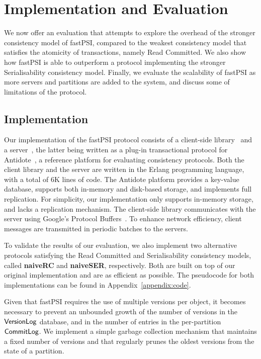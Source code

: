 \cleardoublepage
\chapter{Implementation and Evaluation}
\label{chapter:evaluation}

We now offer an evaluation that attempts to explore the overhead of the stronger consistency model of fastPSI, compared to the weakest consistency model that satisfies the atomicity of transactions, namely Read Committed. We also show how fastPSI is able to outperform a protocol implementing the stronger Serialisability consistency model. Finally, we evaluate the scalability of fastPSI as more servers and partitions are added to the system, and discuss some of limitations of the protocol.

\section{Implementation}

Our implementation of the fastPSI protocol consists of a client-side library~\citep{fastPSIclient} and a server~\citep{pvc-server}, the latter being written as a plug-in transactional protocol for Antidote~\citep{antidote-db}, a reference platform for evaluating consistency protocols. Both the client library and the server are written in the Erlang programming language, with a total of 6K lines of code. The Antidote platform provides a key-value database, supports both in-memory and disk-based storage, and implements full replication. For simplicity, our implementation only supports in-memory storage, and lacks a replication mechanism. The client-side library communicates with the server using Google's Protocol Buffers~\citep{protobuf}. To enhance network efficiency, client messages are transmitted in periodic batches to the servers.

To validate the results of our evaluation, we also implement two alternative protocols satisfying the Read Committed and Serialisability consistency models, called \textbf{naiveRC} and \textbf{naiveSER}, respectively. Both are built on top of our original implementation and are as efficient as possible. The pseudocode for both implementations can be found in Appendix~\ref{appendix:code}.

Given that fastPSI requires the use of multiple versions per object, it becomes necessary to prevent an unbounded growth of the number of versions in the $\mathsf{VersionLog}$ database, and in the number of entries in the per-partition $\mathsf{CommitLog}$. We implement a simple garbage collection mechanism that maintains a fixed number of versions and that regularly prunes the oldest versions from the state of a partition.

